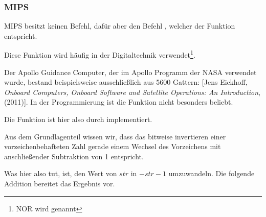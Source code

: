 \subsubsection{MIPS}




MIPS besitzt keinen \NOT Befehl, dafür aber den Befehl \NOT, welcher der
Funktion  entspricht.

Diese Funktion wird häufig in der Digitaltechnik verwendet\footnote{NOR wird
  genannt}.

Der Apollo Guidance Computer, der im Apollo Programm der NASA verwendet wurde,
bestand beispielsweise ausschließlich aus 5600 \NOR Gattern:
[Jens Eickhoff, \emph{Onboard Computers, Onboard Software and Satellite
Operations: An Introduction}, (2011)].
In der Programmierung ist die Funktion \NOT nicht besonders beliebt. 

Die \NOT Funktion ist hier also durch  implementiert.

Aus dem Grundlagenteil  wissen wir, dass das bitweise
invertieren einer vorzeichenbehafteten Zahl gerade einem Wechsel des Vorzeichens
mit anschließender Subtraktion von 1 entspricht. 

Was \NOT hier also tut, ist, den Wert von $str$ in $-str-1$ umzuwandeln. 
Die folgende Addition bereitet das Ergebnis vor.
